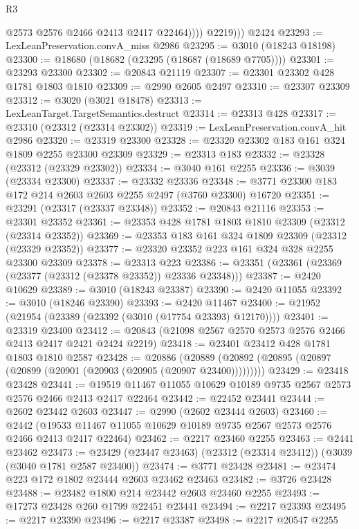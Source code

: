 \begin{lexlean}{R3}
\begin{coremodule}
                @2573
                @2576
                @2466
                @2413
                @2417
                @22464))))
          @2219)))
    @2424
@23293 := LexLeanPreservation.convA_miss @2986
@23295 := @3010 (@18243 @18198)
@23300 := @18680 (@18682 (@23295 (@18687 (@18689 @7705))))
@23301 := @23293 @23300
@23302 := @20843 @21119
@23307 := @23301 @23302 @428 @1781 @1803 @1810
@23309 := @2990 @2605 @2497
@23310 := @23307 @23309
@23312 := @3020 (@3021 @18478)
@23313 := LexLeanTarget.TargetSemantics.destruct
@23314 := @23313 @428
@23317 := @23310 (@23312 (@23314 @23302))
@23319 := LexLeanPreservation.convA_hit @2986
@23320 := @23319 @23300
@23328 := @23320 @23302 @183 @161 @324 @1809 @2255 @23300 @23309
@23329 := @23313 @183
@23332 := @23328 (@23312 (@23329 @23302))
@23334 := @3040 @161 @2255
@23336 := @3039 (@23334 @23300)
@23337 := @23332 @23336
@23348 := @3771 @23300 @183 @172 @214 @2603 @2603 @2255 @2497 (@3760 @23300) @16720
@23351 := @23291 (@23317 (@23337 @23348))
@23352 := @20843 @21116
@23353 := @23301 @23352
@23361 := @23353 @428 @1781 @1803 @1810 @23309 (@23312 (@23314 @23352))
@23369 := @23353 @183 @161 @324 @1809 @23309 (@23312 (@23329 @23352))
@23377 := @23320 @23352 @223 @161 @324 @328 @2255 @23300 @23309
@23378 := @23313 @223
@23386 := @23351 (@23361 (@23369 (@23377 (@23312 (@23378 @23352)) @23336 @23348)))
@23387 := @2420 @10629
@23389 := @3010 (@18243 @23387)
@23390 := @2420 @11055
@23392 := @3010 (@18246 @23390)
@23393 := @2420 @11467
@23400 := @21952 (@21954 (@23389 (@23392 (@3010 (@17754 @23393) @12170))))
@23401 := @23319 @23400
@23412 := @20843 (@21098 @2567 @2570 @2573 @2576 @2466 @2413 @2417 @2421 @2424 @2219)
@23418 := @23401 @23412 @428 @1781 @1803 @1810 @2587
@23428 := @20886
    (@20889 (@20892 (@20895 (@20897 (@20899 (@20901 (@20903 (@20905 (@20907 @23400)))))))))
@23429 := @23418 @23428
@23441 := @19519 @11467 @11055 @10629 @10189 @9735 @2567 @2573 @2576 @2466 @2413 @2417 @22464
@23442 := @22452 @23441
@23444 := @2602 @23442 @2603
@23447 := @2990 (@2602 @23444 @2603)
@23460 := @2442
    (@19533 @11467 @11055 @10629 @10189 @9735 @2567 @2573 @2576 @2466 @2413 @2417 @22464)
@23462 := @2217 @23460 @2255
@23463 := @2441 @23462
@23473 := @23429 (@23447 @23463) (@23312 (@23314 @23412)) (@3039 (@3040 @1781 @2587 @23400))
@23474 := @3771 @23428
@23481 := @23474 @223 @172 @1802 @23444 @2603 @23462 @23463
@23482 := @3726 @23428
@23488 := @23482 @1800 @214 @23442 @2603 @23460 @2255
@23493 := @17273 @23428 @260 @1799 @22451 @23441
@23494 := @2217 @23393
@23495 := @2217 @23390
@23496 := @2217 @23387
@23498 := @2217 @20547 @2255

\end{coremodule}
\end{lexlean}
